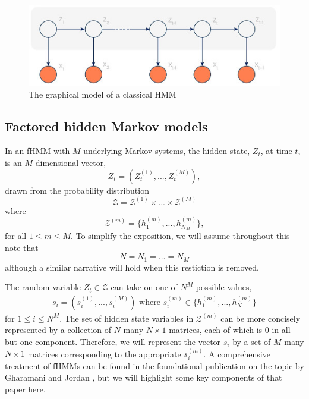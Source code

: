 \documentclass{amsart}
\begin{document}
\begin{figure}
\centering
\includegraphics[scale=0.5]{figures/hmm.jpg}
\caption{The graphical model of a classical HMM}\label{fig:HMM}
\end{figure}

\subsection{Factored hidden Markov models}
In an fHMM with $M$ underlying Markov systems, the hidden state, $Z_t$, at time $t$, is an $M$-dimensional vector,
\[
Z_t = (Z_{t}^{(1)},...,Z_{t}^{(M)}),
\]
drawn from the probability distribution
\[
\mathcal Z = \mathcal{Z}^{(1)}\times ...\times \mathcal{Z}^{(M)}
\]
where 
\[
\mathcal Z^{(m)} = \{h_1^{(m)},...,h_{N_M}^{(m)}\}, 
\]
for all $1\leq m\leq M$.  To simplify the exposition, we will assume throughout this note that 
\[
N = N_1 = ...= N_M
\]
although a similar narrative will hold when this restiction is removed. 

The random variable $Z_t\in \mathcal Z$ can take on one of $N^M$ possible values, 
\begin{eqnarray}\label{eqn:vec}
s_i = (s_{i}^{(1)},...,s_{i}^{(M)})\text{ where }s_i^{(m)}\in \{h_1^{(m)},...,h_{N}^{(m)}\}
\end{eqnarray}
for $1\leq i\leq N^M$.  The set of hidden 
state variables in $\mathcal Z^{(m)}$ can be more concisely 
represented by a collection of $N$ 
many $N\times 1$ matrices, each 
of which is 0 in all but one component.  Therefore, we will represent the vector $s_i$ by a 
set of $M$ many $N\times1$ matrices corresponding to the appropriate 
$s_i^{(m)}$. A comprehensive treatment of fHMMs can be found in the foundational publication 
on the topic by Gharamani and Jordan \cite{GJ95}, but we will highlight some 
key components of that paper here.  
\end{document}
